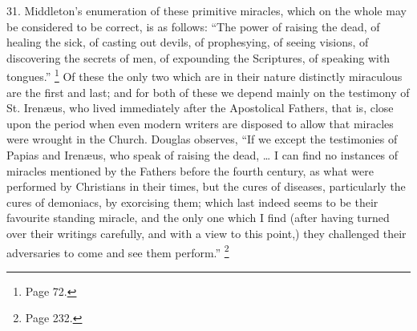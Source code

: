 31.
Middleton's enumeration of these primitive miracles, which on the
whole may be considered to be correct, is as follows: ``The power of
raising the dead, of healing the sick, of casting out devils, of
prophesying, of seeing visions, of discovering the secrets of men, of
expounding the Scriptures, of speaking with tongues.'' \footnote{Page 72.} Of
these the only two which are in their nature distinctly miraculous are
the first and last; and for both of these we depend mainly on the
testimony of St. Irenæus, who lived immediately after the Apostolical
Fathers, that is, close upon the period when even modern writers are
disposed to allow that miracles were wrought in the Church. Douglas
observes, ``If we except the testimonies of Papias and Irenæus, who
speak of raising the dead, … I can find no instances of miracles
mentioned by the Fathers before the fourth century, as what were
performed by Christians in their times, but the cures of diseases,
particularly the cures of demoniacs, by exorcising them; which last
indeed seems to be their favourite standing miracle, and the only one
which I find (after having turned over their writings carefully, and
with a view to this point,) they challenged their adversaries to come
and see them perform.'' \footnote{Page 232.}

